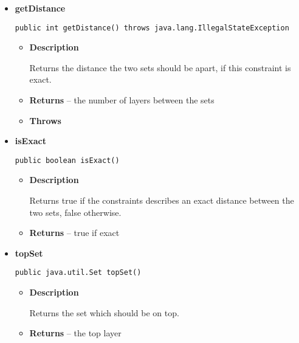 {{{{{{{{\begin{itemize}
{\begin{itemize}
{Returns the set which should be below.
}
\item{{\bf  Returns} -- 
the bottom layer 
}%
\end{itemize}
}%
\item{ 
{\bf  getDistance}\\
\begin{lstlisting}[frame=none]
public int getDistance() throws java.lang.IllegalStateException\end{lstlisting} %
\begin{itemize}
\item{
{\bf  Description}

Returns the distance the two sets should be apart, if this constraint is exact.
}
\item{{\bf  Returns} -- 
the number of layers between the sets 
}%
\item{{\bf  Throws}
}%
\end{itemize}
}%
\item{ 
{\bf  isExact}\\
\begin{lstlisting}[frame=none]
public boolean isExact()\end{lstlisting} %
\begin{itemize}
\item{
{\bf  Description}

Returns true if the constraints describes an exact distance between the two sets, false otherwise.
}
\item{{\bf  Returns} -- 
true if exact 
}%
\end{itemize}
}%
\item{ 
{\bf  topSet}\\
\begin{lstlisting}[frame=none]
public java.util.Set topSet()\end{lstlisting} %
\begin{itemize}
\item{
{\bf  Description}

Returns the set which should be on top.
}
\item{{\bf  Returns} -- 
the top layer 
}%
\end{itemize}
}%
\end{itemize}
}
}
}}}}}}
